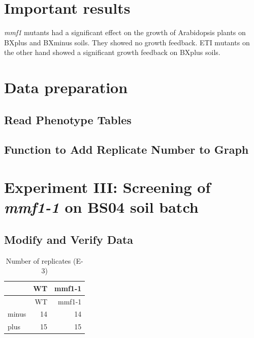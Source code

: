 \documentclass[
  10pt,
]{article}
\begin{document}
\section{Important results}\label{important-results}

\emph{mmf1} mutants had a significant effect on the growth of
Arabidopsis plants on BXplus and BXminus soils. They showed no growth
feedback. ETI mutants on the other hand showed a significant growth
feedback on BXplus soils.

\section{Data preparation}\label{data-preparation}

\subsection{Read Phenotype Tables}\label{read-phenotype-tables}

\subsection{Function to Add Replicate Number to
Graph}\label{function-to-add-replicate-number-to-graph}

\section{\texorpdfstring{Experiment III: Screening of \emph{mmf1-1} on
BS04 soil
batch}{Experiment III: Screening of mmf1-1 on BS04 soil batch}}\label{experiment-iii-screening-of-mmf1-1-on-bs04-soil-batch}

\subsection{Modify and Verify Data}\label{modify-and-verify-data}

\begin{longtable}[]{@{}lrr@{}}
\caption{Number of replicates (E-3)}\tabularnewline
\toprule\noalign{}
& WT & mmf1-1 \\
\midrule\noalign{}
\endfirsthead
\toprule\noalign{}
& WT & mmf1-1 \\
\midrule\noalign{}
\endhead
\bottomrule\noalign{}
\endlastfoot
minus & 14 & 14 \\
plus & 15 & 15 \\
\end{longtable}
\end{document}
